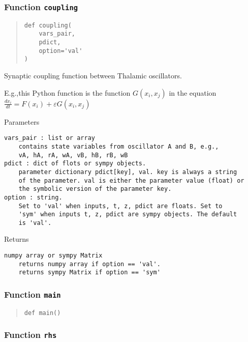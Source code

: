 \documentclass[english,a4paper,oneside]{article}
\begin{document}
\subsubsection{\texorpdfstring{Function
\texttt{coupling}}{Function coupling}}\label{Thalamic.coupling}

\begin{quote}
\begin{verbatim}
def coupling(
    vars_pair,
    pdict,
    option='val'
)
\end{verbatim}
\end{quote}

Synaptic coupling function between Thalamic oscillators.

E.g.,this Python function is the function \(G(x_i,x_j)\) in the equation
\(\frac{dx_i}{dt} = F(x_i) + \varepsilon G(x_i,x_j)\)

Parameters

\begin{verbatim}
vars_pair : list or array
    contains state variables from oscillator A and B, e.g.,
    vA, hA, rA, wA, vB, hB, rB, wB  
pdict : dict of flots or sympy objects.
    parameter dictionary pdict[key], val. key is always a string
    of the parameter. val is either the parameter value (float) or 
    the symbolic version of the parameter key.
option : string.
    Set to 'val' when inputs, t, z, pdict are floats. Set to
    'sym' when inputs t, z, pdict are sympy objects. The default
    is 'val'.
\end{verbatim}

Returns

\begin{verbatim}
numpy array or sympy Matrix
    returns numpy array if option == 'val'. 
    returns sympy Matrix if option == 'sym'
\end{verbatim}

\subsubsection{\texorpdfstring{Function
\texttt{main}}{Function main}}\label{Thalamic.main}

\begin{quote}
\begin{verbatim}
def main()
\end{verbatim}
\end{quote}

\subsubsection{\texorpdfstring{Function
\texttt{rhs}}{Function rhs}}\label{Thalamic.rhs}
\end{document}
